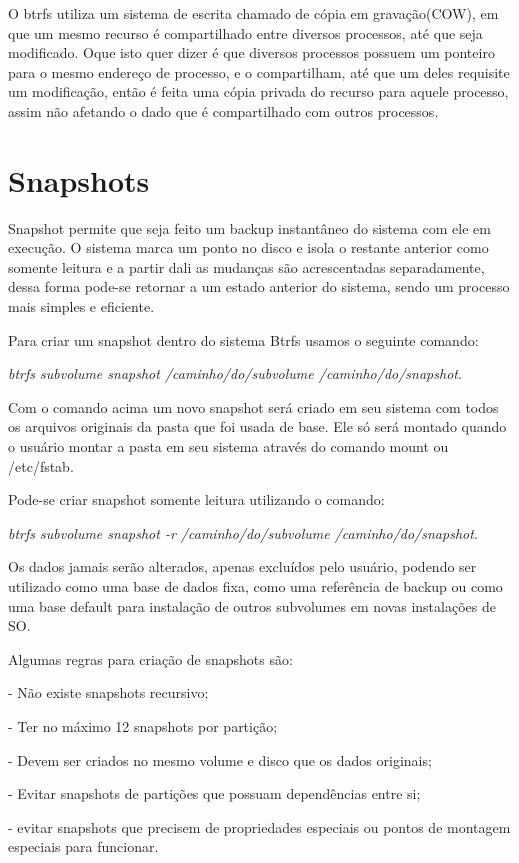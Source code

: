 \documentclass[12pt]{article}
\begin{document}
O btrfs utiliza um sistema de escrita chamado de cópia em gravação(COW), em que um mesmo recurso é compartilhado entre diversos processos, até que seja modificado. Oque isto quer dizer é que diversos processos possuem um ponteiro para o mesmo endereço de processo, e o compartilham, até que um deles requisite um modificação, então é feita uma cópia privada do recurso para aquele processo, assim não afetando o dado que é compartilhado com outros processos. 
 
 \newpage
\section{Snapshots}

Snapshot permite que seja feito um backup instantâneo do sistema com ele em execução. O sistema marca um ponto no disco e isola o restante anterior como somente leitura e a partir dali as mudanças são acrescentadas separadamente, dessa forma pode-se retornar a um estado anterior do sistema, sendo um processo mais simples e eficiente.

Para criar um snapshot dentro do sistema Btrfs usamos o seguinte comando:

\textit{btrfs subvolume snapshot /caminho/do/subvolume /caminho/do/snapshot}.

Com o comando acima um novo snapshot será criado em seu sistema com todos os arquivos originais da pasta que foi usada de base. Ele só será montado quando o usuário montar a pasta em seu sistema através do comando mount ou /etc/fstab.

Pode-se criar snapshot somente leitura utilizando o comando:

\textit{btrfs subvolume snapshot -r /caminho/do/subvolume /caminho/do/snapshot}.

Os dados jamais serão alterados, apenas excluídos pelo usuário, podendo ser utilizado como uma base de dados fixa, como uma referência de backup ou como uma base default para instalação de outros subvolumes em novas instalações de SO.

Algumas regras para criação de snapshots são:

- Não existe snapshots recursivo;

- Ter no máximo 12 snapshots por partição;

- Devem ser criados no mesmo volume e disco que os dados originais;

- Evitar snapshots de partições que possuam dependências entre si;

- evitar snapshots que precisem de propriedades especiais ou pontos de montagem especiais para funcionar.
\end{document}
